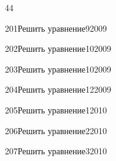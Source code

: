 \begin{TrigSourcePage}{44}
\begin{TrigExercise}{201}{Решить уравнение}{9}{2009}
\end{TrigExercise}
\begin{TrigExercise}{202}{Решить уравнение}{10}{2009}
\end{TrigExercise}
\begin{TrigExercise}{203}{Решить уравнение}{10}{2009}
\end{TrigExercise}
\begin{TrigExercise}{204}{Решить уравнение}{12}{2009}
\end{TrigExercise}
\begin{TrigExercise}{205}{Решить уравнение}{1}{2010}
\end{TrigExercise}
\begin{TrigExercise}{206}{Решить уравнение}{2}{2010}
\end{TrigExercise}
\begin{TrigExercise}{207}{Решить уравнение}{3}{2010}
\end{TrigExercise}
\end{TrigSourcePage}

